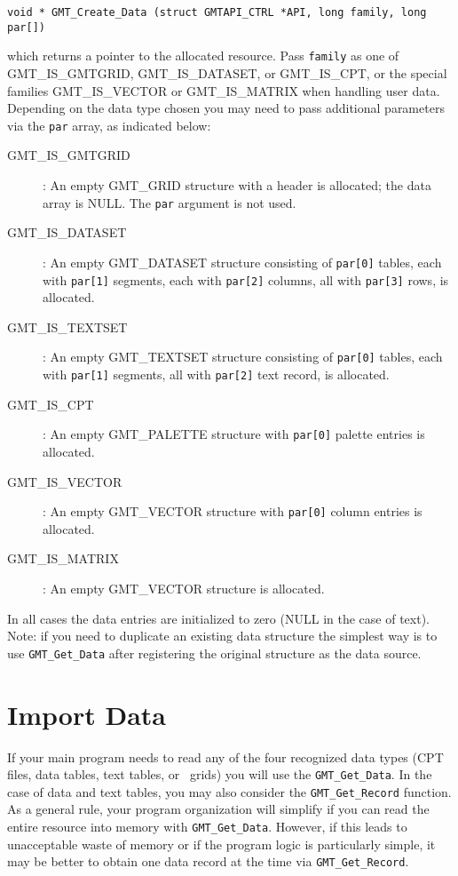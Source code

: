 \documentclass{report}
\begin{document}
\begin{verbatim}
void * GMT_Create_Data (struct GMTAPI_CTRL *API, long family, long par[])
\end{verbatim}
which returns a pointer to the allocated resource.
Pass \texttt{family} as one of GMT\_IS\_GMTGRID, GMT\_IS\_DATASET, or GMT\_IS\_CPT,
or the special families GMT\_IS\_VECTOR or GMT\_IS\_MATRIX when handling user data.
Depending on the data type chosen you may need to pass additional parameters via
the \texttt{par} array, as indicated below:
\begin{description}
	\item [GMT\_IS\_GMTGRID]: An empty GMT\_GRID structure with a header is
	allocated; the data array is NULL.  The \texttt{par} argument is not used.
	\item [GMT\_IS\_DATASET]: An empty GMT\_DATASET structure consisting of
	\texttt{par[0]} tables, each with \texttt{par[1]} segments, each with
	\texttt{par[2]} columns, all with \texttt{par[3]} rows, is allocated.
	\item [GMT\_IS\_TEXTSET]: An empty GMT\_TEXTSET structure consisting of
	\texttt{par[0]} tables, each with \texttt{par[1]} segments,
	all with \texttt{par[2]} text record, is allocated.
	\item [GMT\_IS\_CPT]: An empty GMT\_PALETTE structure with \texttt{par[0]}
	palette entries is allocated.
	\item [GMT\_IS\_VECTOR]: An empty GMT\_VECTOR structure with \texttt{par[0]}
	column entries is allocated.
	\item [GMT\_IS\_MATRIX]: An empty GMT\_VECTOR structure is allocated.
\end{description}
In all cases the data entries are initialized to zero (NULL in the case of text).
Note: if you need to
duplicate an existing data structure the simplest way is to use \texttt{GMT\_Get\_Data}
after registering the original structure as the data source.

\section{Import Data}

If your main program needs to read any of the four recognized data types (CPT files, data tables, text tables, or \GMT\ grids)
you will use the \texttt{GMT\_Get\_Data}. In the case of data and text tables, you may also consider the
\texttt{GMT\_Get\_Record} function.
As a general rule, your program organization will simplify if you can read the entire resource into memory with
\texttt{GMT\_Get\_Data}.  However, if this leads to unacceptable waste of memory or if the program logic is particularly simple,
it may be better to obtain one data record at the time via \texttt{GMT\_Get\_Record}.
\end{document}
